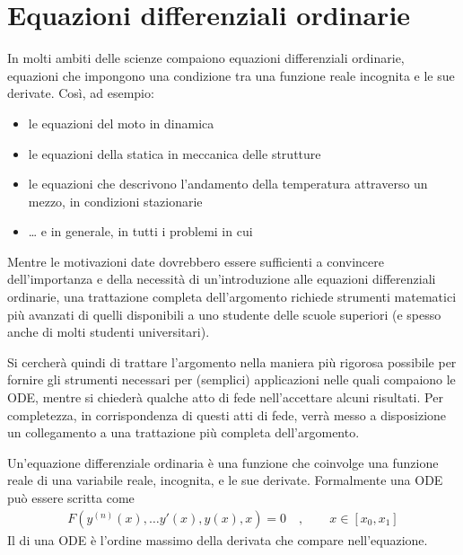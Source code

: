 \documentclass[letterpaper,10pt,english]{jupyterBook}
\begin{document}
\section{Equazioni differenziali ordinarie}
\label{\detokenize{ch/ode:equazioni-differenziali-ordinarie}}\label{\detokenize{ch/ode:ode-hs}}\label{\detokenize{ch/ode::doc}}
\sphinxAtStartPar
{} In molti ambiti delle scienze compaiono equazioni differenziali ordinarie, equazioni che impongono una condizione tra una funzione reale incognita e le sue derivate. Così, ad esempio:
\begin{itemize}
\item {} 
\sphinxAtStartPar
le equazioni del moto in dinamica

\item {} 
\sphinxAtStartPar
le equazioni della statica in meccanica delle strutture

\item {} 
\sphinxAtStartPar
le equazioni che descrivono l’andamento della temperatura attraverso un mezzo, in condizioni stazionarie

\item {} 
\sphinxAtStartPar
…
e in generale, in tutti i problemi in cui 

\end{itemize}

\sphinxAtStartPar
{}
Mentre le motivazioni date dovrebbero essere sufficienti a convincere dell’importanza e della necessità di un’introduzione alle equazioni differenziali ordinarie, una trattazione completa dell’argomento richiede strumenti matematici più avanzati di quelli disponibili a uno studente delle scuole superiori (e spesso anche di molti studenti universitari).

\sphinxAtStartPar
Si cercherà quindi di trattare l’argomento nella maniera più rigorosa possibile per fornire gli strumenti necessari per (semplici) applicazioni nelle quali compaiono le ODE, mentre si chiederà qualche atto di fede nell’accettare alcuni risultati. Per completezza, in corrispondenza di questi atti di fede, verrà messo a disposizione un collegamento a una trattazione più completa dell’argomento.

\sphinxAtStartPar
{}
Un’equazione differenziale ordinaria è una funzione che coinvolge una funzione reale di una variabile reale, incognita, e le sue derivate. Formalmente una ODE può essere scritta come
\begin{equation*}
\begin{split}F(y^{(n)}(x), \dots y'(x), y(x), x) = 0 \quad , \qquad x \in [x_0, x_1]\end{split}
\end{equation*}
\sphinxAtStartPar
Il  di una ODE è l’ordine massimo della derivata che compare nell’equazione.
\end{document}
